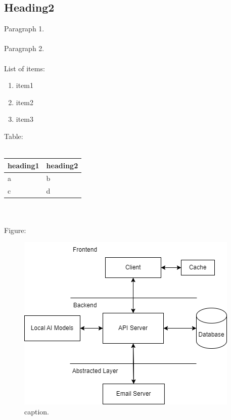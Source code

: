 \documentclass[../main.tex]{subfiles}
\begin{document}
\subsection{Heading2}
Paragraph 1.
\\\\
Paragraph 2. \cite{ref1}
\\\\
List of items:
\begin{enumerate}
    \item item1
    \item item2
    \item item3
\end{enumerate}
Table:\\\\
\begin{tabular}{ |p{3.25in}|p{3.25in}| }
    \hline
    heading1 &
    heading2
    \\\hline
    a & b
    \\\hline
    c & d
    \\\hline
\end{tabular}\\\\
Figure:
\begin{figure}[H]
    \includegraphics[scale=0.25]{../figures/architecture1}
    \centering
    \caption{caption.}
    \label{architecture1}
\end{figure}
\end{document}
